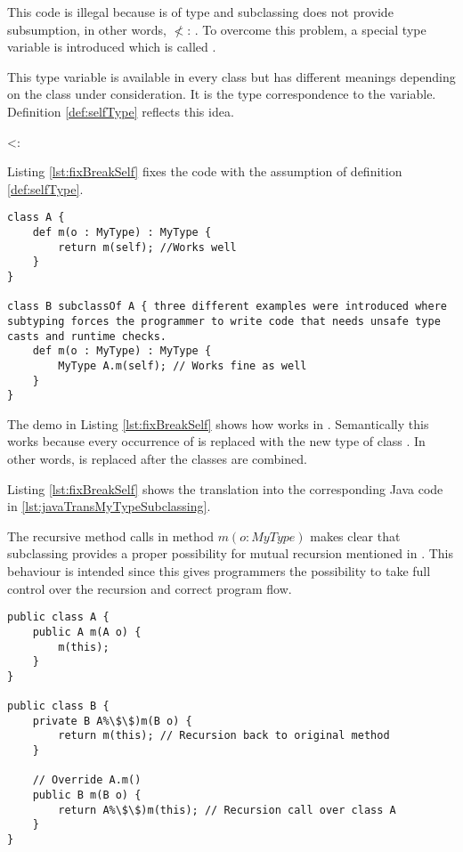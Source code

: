 This code is illegal because \self is of type \B and subclassing does
not provide subsumption, in other words, \B $\nless$: \A. To overcome this problem,
a special type variable is introduced which is called \mytype.

This type variable is available in every class but has different meanings
depending on the class under consideration. It is the type correspondence
to the \self variable. Definition \ref{def:selfType} reflects this idea.

\begin{defn}
	\label{def:selfType}
	\self <: \mytype
\end{defn}

Listing \ref{lst:fixBreakSelf} fixes the code with the assumption of
definition \ref{def:selfType}.

\begin{lstlisting}[float,language=ooplss,caption=Type safe code with \mytype,label=lst:fixBreakSelf]
class A {
	def m(o : MyType) : MyType {
		return m(self); //Works well
	}
}

class B subclassOf A { three different examples were introduced where subtyping forces the programmer to write code that needs unsafe type casts and runtime checks.
	def m(o : MyType) : MyType {
		MyType A.m(self); // Works fine as well
	}
}
\end{lstlisting}

The demo in Listing \ref{lst:fixBreakSelf} shows how \mytype works 
in \ooplss.  Semantically this works because every occurrence of \mytype
is replaced with the new type of class \B. In other words, \mytype is
replaced after the classes are combined.

Listing \ref{lst:fixBreakSelf} shows the translation into the corresponding
Java code in \ref{lst:javaTransMyTypeSubclassing}. 

The recursive
method calls in method $m(o : MyType)$ makes clear that subclassing
provides a proper possibility for mutual recursion mentioned in
. This behaviour is intended since this gives
programmers the possibility to take full control over the recursion
and correct program flow.

\begin{lstlisting}[float,caption=Subclassing with \mytype translated to Java,label=lst:javaTransMyTypeSubclassing]
public class A {
	public A m(A o) {
		m(this);
	}
}

public class B {
	private B A%\$\$)m(B o) {
		return m(this); // Recursion back to original method
	}

	// Override A.m()
	public B m(B o) {
		return A%\$\$)m(this); // Recursion call over class A
	}
}
\end{lstlisting}

